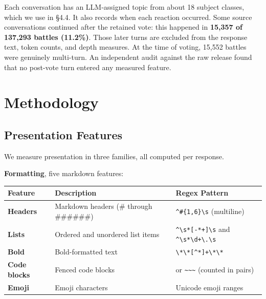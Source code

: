 \documentclass[
]{article}
\newcounter{none} %
\begin{document}
Each conversation has an LLM-assigned topic from about 18 subject
classes, which we use in §4.4. It also records when each reaction
occurred. Some source conversations continued after the retained vote:
this happened in \textbf{15,357 of 137,293 battles (11.2\%)}. Those
later turns are excluded from the response text, token counts, and depth
measures. At the time of voting, 15,552 battles were genuinely
multi-turn. An independent audit against the raw release found that no
post-vote turn entered any measured feature.

\section{Methodology}\label{methodology}

\subsection{Presentation Features}\label{presentation-features}

We measure presentation in three families, all computed per response.

\textbf{Formatting}, five markdown features:

{\def\LTcaptype{none} %
\begin{longtable}[]{@{}
  >{\raggedright\arraybackslash}p{}
  >{\raggedright\arraybackslash}p{}
  >{\raggedright\arraybackslash}p{}@{}}
\toprule\noalign{}
\begin{minipage}[b]{\linewidth}\raggedright
Feature
\end{minipage} & \begin{minipage}[b]{\linewidth}\raggedright
Description
\end{minipage} & \begin{minipage}[b]{\linewidth}\raggedright
Regex Pattern
\end{minipage} \\
\midrule\noalign{}
\endhead
\bottomrule\noalign{}
\endlastfoot
\textbf{Headers} & Markdown headers (\# through \#\#\#\#\#\#) &
\texttt{\^{}\#\{1,6\}\textbackslash{}s} (multiline) \\
\textbf{Lists} & Ordered and unordered list items &
\texttt{\^{}\textbackslash{}s*{[}-*+{]}\textbackslash{}s} and
\texttt{\^{}\textbackslash{}s*\textbackslash{}d+\textbackslash{}.\textbackslash{}s} \\
\textbf{Bold} & Bold-formatted text &
\texttt{\textbackslash{}*\textbackslash{}*{[}\^{}*{]}+\textbackslash{}*\textbackslash{}*} \\
\textbf{Code blocks} & Fenced code blocks &
\texttt{\textasciigrave{}\textasciigrave{}\textasciigrave{}} or
\texttt{\textasciitilde{}\textasciitilde{}\textasciitilde{}} (counted in
pairs) \\
\textbf{Emoji} & Emoji characters & Unicode emoji ranges \\
\end{longtable}
}
\end{document}
